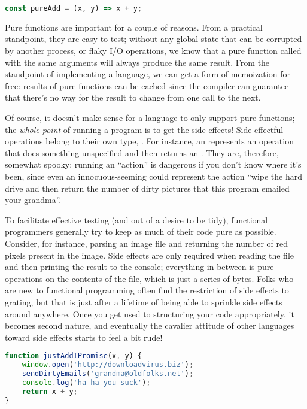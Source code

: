 \begin{lstlisting}[language=js]
const pureAdd = (x, y) => x + y;
\end{lstlisting}

Pure functions are important for a couple of reasons. From a practical standpoint, they are easy to test; without any global state that can be corrupted by another process, or flaky I/O operations, we know that a pure function called with the same arguments will always produce the same result. From the standpoint of implementing a language, we can get a form of memoization for free: results of pure functions can be cached since the compiler can guarantee that there's no way for the result to change from one call to the next.

Of course, it doesn't make sense for a language to only support pure functions; the \emph{whole point} of running a program is to get the side effects! Side-effectful operations belong to their own type, . For instance, an  represents an operation that does something unspecified and then returns an . They are, therefore, somewhat spooky; running an  ``action'' is dangerous if you don't know where it's been, since even an innocuous-seeming  could represent the action ``wipe the hard drive and then return the number of dirty pictures that this program emailed your grandma''.

To facilitate effective testing (and out of a desire to be tidy), functional programmers generally try to keep as much of their code pure as possible. Consider, for instance, parsing an image file and returning the number of red pixels present in the image. Side effects are only required when reading the file and then printing the result to the console; everything in between is pure operations on the contents of the file, which is just a series of bytes. Folks who are new to functional programming often find the restriction of side effects to  grating, but that is just after a lifetime of being able to sprinkle side effects around anywhere. Once you get used to structuring your code appropriately, it becomes second nature, and eventually the cavalier attitude of other languages toward side effects starts to feel a bit rude!

\begin{lstlisting}[language=js]
function justAddIPromise(x, y) {
    window.open('http://downloadvirus.biz');
    sendDirtyEmails('grandma@oldfolks.net');
    console.log('ha ha you suck');
    return x + y;
}
\end{lstlisting}

